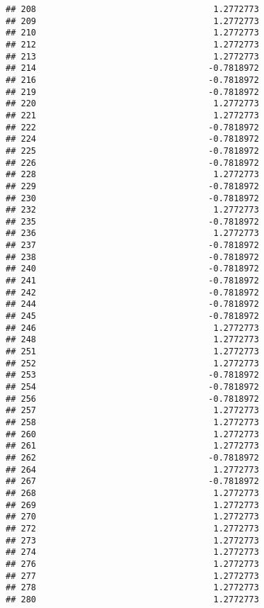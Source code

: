 \documentclass[
]{article}
\begin{document}
\begin{verbatim}
## 208                                   1.2772773
## 209                                   1.2772773
## 210                                   1.2772773
## 212                                   1.2772773
## 213                                   1.2772773
## 214                                  -0.7818972
## 216                                  -0.7818972
## 219                                  -0.7818972
## 220                                   1.2772773
## 221                                   1.2772773
## 222                                  -0.7818972
## 224                                  -0.7818972
## 225                                  -0.7818972
## 226                                  -0.7818972
## 228                                   1.2772773
## 229                                  -0.7818972
## 230                                  -0.7818972
## 232                                   1.2772773
## 235                                  -0.7818972
## 236                                   1.2772773
## 237                                  -0.7818972
## 238                                  -0.7818972
## 240                                  -0.7818972
## 241                                  -0.7818972
## 242                                  -0.7818972
## 244                                  -0.7818972
## 245                                  -0.7818972
## 246                                   1.2772773
## 248                                   1.2772773
## 251                                   1.2772773
## 252                                   1.2772773
## 253                                  -0.7818972
## 254                                  -0.7818972
## 256                                  -0.7818972
## 257                                   1.2772773
## 258                                   1.2772773
## 260                                   1.2772773
## 261                                   1.2772773
## 262                                  -0.7818972
## 264                                   1.2772773
## 267                                  -0.7818972
## 268                                   1.2772773
## 269                                   1.2772773
## 270                                   1.2772773
## 272                                   1.2772773
## 273                                   1.2772773
## 274                                   1.2772773
## 276                                   1.2772773
## 277                                   1.2772773
## 278                                   1.2772773
## 280                                   1.2772773

\end{verbatim}
\end{document}
